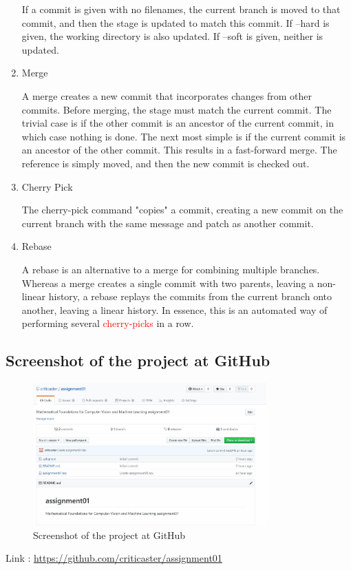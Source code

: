 \documentclass[a4paper]{article}
\begin{document}
\begin{CJK}{UTF8}{mj}
\begin{enumerate}[label=(\alph*)]
If a commit is given with no filenames, the current branch is moved to that commit, and then the stage is updated to match this commit. If --hard is given, the working directory is also updated. If --soft is given, neither is updated.

\item Merge

A merge creates a new commit that incorporates changes from other commits. Before merging, the stage must match the current commit. The trivial case is if the other commit is an ancestor of the current commit, in which case nothing is done. The next most simple is if the current commit is an ancestor of the other commit. This results in a fast-forward merge. The reference is simply moved, and then the new commit is checked out.

\item Cherry Pick

The cherry-pick command "copies" a commit, creating a new commit on the current branch with the same message and patch as another commit.

\item Rebase

A rebase is an alternative to a merge for combining multiple branches. Whereas a merge creates a single commit with two parents, leaving a non-linear history, a rebase replays the commits from the current branch onto another, leaving a linear history. In essence, this is an automated way of performing several \textcolor{red}{cherry-picks} in a row.

\end{enumerate}



\subsection{Screenshot of the project at GitHub}

\begin{figure}[h!]
	\centering
	\includegraphics[width=0.8\textwidth]{ag01}
	\caption{Screenshot of the project at GitHub}
\end{figure}

Link : \href{https://github.com/criticaster/assignment01}
    {https://github.com/criticaster/assignment01}

\end{CJK}
\end{document}
